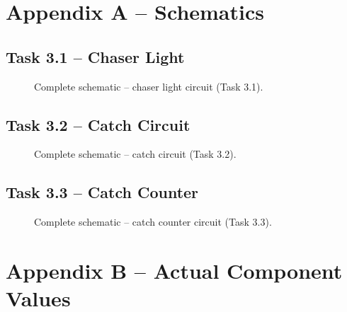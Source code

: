 \documentclass[12pt, a4paper]{article}
\begin{document}
\appendix
\section{Appendix A -- Schematics}

\subsection{Task 3.1 -- Chaser Light}

\begin{figure}[H]
  \centering
  \caption{Complete schematic -- chaser light circuit (Task 3.1).}
  \label{fig:schematic_31}
\end{figure}

\subsection{Task 3.2 -- Catch Circuit}

\begin{figure}[H]
  \centering
  \caption{Complete schematic -- catch circuit (Task 3.2).}
  \label{fig:schematic_32}
\end{figure}

\subsection{Task 3.3 -- Catch Counter}

\begin{figure}[H]
  \centering
  \caption{Complete schematic -- catch counter circuit (Task 3.3).}
  \label{fig:schematic_33}
\end{figure}

\section{Appendix B -- Actual Component Values}
\end{document}
